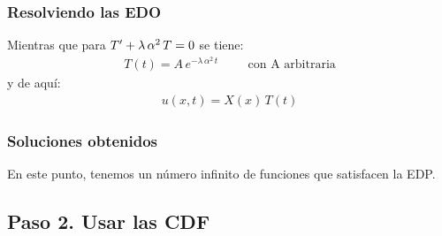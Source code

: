 \documentclass[12pt]{beamer}
\begin{document}
\begin{frame}
\frametitle{Resolviendo las EDO}
Mientras que para ${T}^{\prime} + \lambda \, \alpha^{2} \, T = 0$ se tiene:
\pause
\begin{align}
T (t) = A \, e^{- \lambda \, \alpha^{2} \, t} \hspace{1cm} \mbox{con A arbitraria}
\label{eq:ecuacion_06_02_36a}    
\end{align}
y de aquí:
\begin{align*}
u (x, t) = X(x) \, T(t) 
\end{align*}
\end{frame}
\begin{frame}
\frametitle{Soluciones obtenidos}
En este punto, tenemos un número infinito de funciones que satisfacen la EDP.
\end{frame}

\subsection{Paso 2. Usar las CDF}
\end{document}
